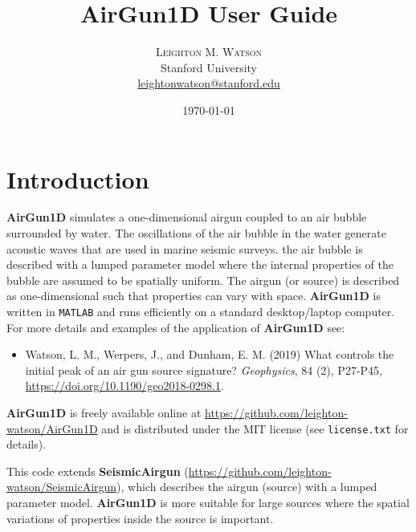 \documentclass[10pt]{article}
\title{AirGun1D User Guide} %
\author{%
\textsc{Leighton M. Watson} \\%
\normalsize Stanford University \\ %
\normalsize \href{mailto:leightonwatson@stanford.edu}{leightonwatson@stanford.edu} %
}
\date{\today} %
\begin{document}
\maketitle


\section{Introduction}
{\bf AirGun1D} simulates a one-dimensional airgun coupled to an air bubble surrounded by water. The oscillations of the air bubble in the water generate acoustic waves that are used in marine seismic surveys. the air bubble is described with a lumped parameter model where the internal properties of the bubble are assumed to be spatially uniform. The airgun (or source) is described as one-dimensional such that properties can vary with space. {\bf AirGun1D} is written in \texttt{MATLAB} and runs efficiently on a standard desktop/laptop computer. For more details and examples of the application of {\bf AirGun1D} see:
\begin{itemize}
\item Watson, L. M., Werpers, J., and Dunham, E. M. (2019) What controls the initial peak of an air gun source signature? \emph{Geophysics}, 84 (2), P27-P45, \href{https://doi.org/10.1190/geo2018-0298.1}{https://doi.org/10.1190/geo2018-0298.1}.
\end{itemize}

{\bf AirGun1D} is freely available online at \href{https://github.com/leighton-watson/AirGun1D}{https://github.com/leighton-watson/AirGun1D} and is distributed under the MIT license (see \texttt{license.txt} for details). 

This code extends {\bf SeismicAirgun} (\href{https://github.com/leighton-watson/SeismicAirgun}{https://github.com/leighton-watson/SeismicAirgun}), which describes the airgun (source) with a lumped parameter model. {\bf AirGun1D} is more suitable for large sources where the spatial variations of properties inside the source is important. 
\end{document}
